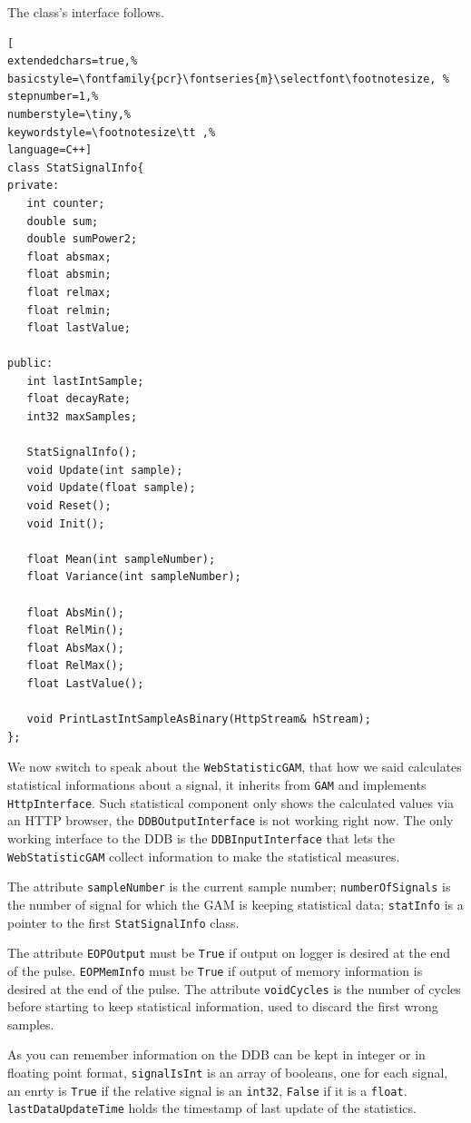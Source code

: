 The class's interface follows.

\begin{lstlisting}[
extendedchars=true,%
basicstyle=\fontfamily{pcr}\fontseries{m}\selectfont\footnotesize, %
stepnumber=1,%
numberstyle=\tiny,%
keywordstyle=\footnotesize\tt ,%
language=C++]
class StatSignalInfo{
private:
   int counter;
   double sum;
   double sumPower2;
   float absmax;
   float absmin;
   float relmax;
   float relmin;
   float lastValue;

public:
   int lastIntSample;
   float decayRate;
   int32 maxSamples;

   StatSignalInfo();
   void Update(int sample);
   void Update(float sample);
   void Reset();
   void Init();

   float Mean(int sampleNumber);
   float Variance(int sampleNumber);

   float AbsMin();
   float RelMin();
   float AbsMax();
   float RelMax();
   float LastValue();

   void PrintLastIntSampleAsBinary(HttpStream& hStream);
};
\end{lstlisting}


We now switch to speak about the \texttt{WebStatisticGAM}, that how we said calculates statistical informations about a signal, it inherits from \texttt{GAM} and implements \texttt{HttpInterface}. Such statistical component only shows the calculated values via an HTTP browser, the \texttt{DDBOutputInterface} is not working right now. The only working interface to the DDB is the \texttt{DDBInputInterface} that lets the \texttt{WebStatisticGAM} collect information to make the statistical measures.

The attribute \texttt{sampleNumber} is the current sample number; \texttt{numberOfSignals} is the number of signal for which the GAM is keeping statistical data; \texttt{statInfo} is a pointer to the first \texttt{StatSignalInfo} class. 

The attribute \texttt{EOPOutput} must be \texttt{True} if output on logger is desired at the end of the pulse. \texttt{EOPMemInfo} must be \texttt{True} if output of memory information is desired at the end of the pulse. The attribute \texttt{voidCycles} is the number of cycles before starting to keep statistical information, used to discard the first wrong samples.

As you can remember information on the DDB can be kept in integer or in floating point format, \texttt{signalIsInt} is an array of booleans, one for each signal, an enrty is \texttt{True} if the relative signal is an \texttt{int32}, \texttt{False} if it is a \texttt{float}. \texttt{lastDataUpdateTime} holds the timestamp of last update of the statistics. \\

